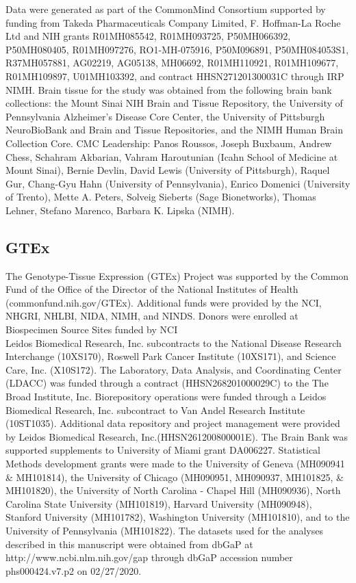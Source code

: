Data were generated as part of the CommonMind Consortium supported by funding from Takeda Pharmaceuticals Company Limited, F. Hoffman-La Roche Ltd and NIH grants R01MH085542, R01MH093725, P50MH066392, P50MH080405, R01MH097276, RO1-MH-075916, P50M096891, P50MH084053S1, R37MH057881, AG02219, AG05138, MH06692, R01MH110921, R01MH109677, R01MH109897, U01MH103392, and contract HHSN271201300031C through IRP NIMH. Brain tissue for the study was obtained from the following brain bank collections: the Mount Sinai NIH Brain and Tissue Repository, the University of Pennsylvania Alzheimer’s Disease Core Center, the University of Pittsburgh NeuroBioBank and Brain and Tissue Repositories, and the NIMH Human Brain Collection Core. CMC Leadership: Panos Roussos, Joseph Buxbaum, Andrew Chess, Schahram Akbarian, Vahram Haroutunian (Icahn School of Medicine at Mount Sinai), Bernie Devlin, David Lewis (University of Pittsburgh), Raquel Gur, Chang-Gyu Hahn (University of Pennsylvania), Enrico Domenici (University of Trento), Mette A. Peters, Solveig Sieberts (Sage Bionetworks), Thomas Lehner, Stefano Marenco, Barbara K. Lipska (NIMH). 

\subsection*{GTEx}

The Genotype-Tissue Expression (GTEx) Project was supported by the Common Fund of the Office of the Director of the National Institutes of Health (commonfund.nih.gov/GTEx). Additional funds were provided by the NCI, NHGRI, NHLBI, NIDA, NIMH, and NINDS. Donors were enrolled at Biospecimen Source Sites funded by NCI\\Leidos Biomedical Research, Inc. subcontracts to the National Disease Research Interchange (10XS170), Roswell Park Cancer Institute (10XS171), and Science Care, Inc. (X10S172). The Laboratory, Data Analysis, and Coordinating Center (LDACC) was funded through a contract (HHSN268201000029C) to the The Broad Institute, Inc. Biorepository operations were funded through a Leidos Biomedical Research, Inc. subcontract to Van Andel Research Institute (10ST1035). Additional data repository and project management were provided by Leidos Biomedical Research, Inc.(HHSN261200800001E). The Brain Bank was supported supplements to University of Miami grant DA006227. Statistical Methods development grants were made to the University of Geneva (MH090941 \& MH101814), the University of Chicago (MH090951, MH090937, MH101825, \& MH101820), the University of North Carolina - Chapel Hill (MH090936), North Carolina State University (MH101819), Harvard University (MH090948), Stanford University (MH101782), Washington University (MH101810), and to the University of Pennsylvania (MH101822). The datasets used for the analyses described in this manuscript were obtained from dbGaP at http://www.ncbi.nlm.nih.gov/gap through dbGaP accession number phs000424.v7.p2 on 02/27/2020. 

